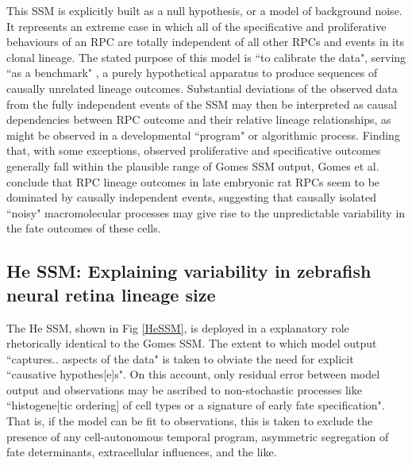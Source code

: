 \documentclass{ut-thesis}
\begin{document}
\begin{NoHyper}
This SSM is explicitly built as a null hypothesis, or a model of background noise. It represents an extreme case in which all of the specificative and proliferative behaviours of an RPC are totally independent of all other RPCs and events in its clonal lineage. The stated purpose of this model is ``to calibrate the data", serving ``as a benchmark" \cite{Gomes2011}, a purely hypothetical apparatus to produce sequences of causally unrelated lineage outcomes. Substantial deviations of the observed data from the fully independent events of the SSM may then be interpreted as causal dependencies between RPC outcome and their relative lineage relationships, as might be observed in a developmental ``program" or algorithmic process. Finding that, with some exceptions, observed proliferative and specificative outcomes generally fall within the plausible range of Gomes SSM output, Gomes et al. conclude that RPC lineage outcomes in late embryonic rat RPCs seem to be dominated by causally independent events, suggesting that causally isolated ``noisy" macromolecular processes may give rise to the unpredictable variability in the fate outcomes of these cells. 

 \subsection{He SSM: Explaining variability in zebrafish neural retina lineage size}

The He SSM, shown in Fig \ref{HeSSM}, is deployed in a explanatory role rhetorically identical to the Gomes SSM. The extent to which model output ``captures.. aspects of the data" is taken to obviate the need for explicit ``causative hypothes[e]s". On this account, only residual error between model output and observations may be ascribed to non-stochastic processes like ``histogene[tic ordering] of cell types or a signature of early fate specification". That is, if the model can be fit to observations, this is taken to exclude the presence of any cell-autonomous temporal program, asymmetric segregation of fate determinants, extracellular influences, and the like. 


\end{NoHyper}
\end{document}
